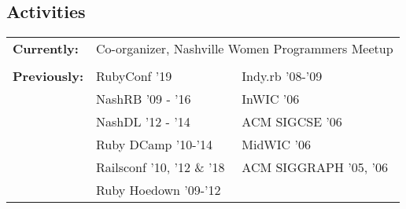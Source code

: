 \documentclass[line, margin, 10pt]{res}
\begin{document}
\begin{resume}
\section{Activities}

\begin{tabular}[t]{@{} p{1.2in} p{1.9in} p{1.9in} @{}}
\bf{Currently:}

& \multicolumn{2}{p{3.8in}}{ Co-organizer, Nashville Women Programmers Meetup} \\ %
\\
\bf{Previously:}
& RubyConf '19  & Indy.rb '08-'09  \\
& NashRB '09 - '16 &  InWIC '06\\
& NashDL '12 - '14 & ACM SIGCSE '06 \\
& Ruby DCamp '10-'14 & MidWIC '06   \\
& Railsconf '10, '12 \& '18 & ACM SIGGRAPH '05, '06 \\
& Ruby Hoedown '09-'12

\end{tabular}
\end{resume}
\end{document}
